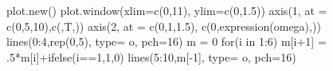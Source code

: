 \documentclass[
  letterpaper,
  DIV=11,
  numbers=noendperiod]{scrartcl}
\newenvironment{Shaded}{\begin{snugshade}}{\end{snugshade}}
\newcommand{\AttributeTok}[1]{\textcolor[rgb]{0.40,0.45,0.13}{#1}}
\newcommand{\ControlFlowTok}[1]{\textcolor[rgb]{0.00,0.23,0.31}{#1}}
\newcommand{\DecValTok}[1]{\textcolor[rgb]{0.68,0.00,0.00}{#1}}
\newcommand{\FloatTok}[1]{\textcolor[rgb]{0.68,0.00,0.00}{#1}}
\newcommand{\FunctionTok}[1]{\textcolor[rgb]{0.28,0.35,0.67}{#1}}
\newcommand{\NormalTok}[1]{\textcolor[rgb]{0.00,0.23,0.31}{#1}}
\newcommand{\OtherTok}[1]{\textcolor[rgb]{0.00,0.23,0.31}{#1}}
\newcommand{\SpecialCharTok}[1]{\textcolor[rgb]{0.37,0.37,0.37}{#1}}
\newcommand{\StringTok}[1]{\textcolor[rgb]{0.13,0.47,0.30}{#1}}
\theoremstyle{plain}
\theoremstyle{plain}
\theoremstyle{definition}
\theoremstyle{definition}
\theoremstyle{remark}
\begin{document}
\begin{Shaded}
\begin{Highlighting}[]
\FunctionTok{plot.new}\NormalTok{()}
\FunctionTok{plot.window}\NormalTok{(}\AttributeTok{xlim=}\FunctionTok{c}\NormalTok{(}\DecValTok{0}\NormalTok{,}\DecValTok{11}\NormalTok{), }\AttributeTok{ylim=}\FunctionTok{c}\NormalTok{(}\DecValTok{0}\NormalTok{,}\FloatTok{1.5}\NormalTok{))}
\FunctionTok{axis}\NormalTok{(}\DecValTok{1}\NormalTok{, }\AttributeTok{at =} \FunctionTok{c}\NormalTok{(}\DecValTok{0}\NormalTok{,}\DecValTok{5}\NormalTok{,}\DecValTok{10}\NormalTok{),}\FunctionTok{c}\NormalTok{(}\StringTok{\textquotesingle{}\textquotesingle{}}\NormalTok{,}\StringTok{\textquotesingle{}T\textquotesingle{}}\NormalTok{,}\StringTok{\textquotesingle{}\textquotesingle{}}\NormalTok{))}
\FunctionTok{axis}\NormalTok{(}\DecValTok{2}\NormalTok{, }\AttributeTok{at =} \FunctionTok{c}\NormalTok{(}\DecValTok{0}\NormalTok{,}\DecValTok{1}\NormalTok{,}\FloatTok{1.5}\NormalTok{), }\FunctionTok{c}\NormalTok{(}\DecValTok{0}\NormalTok{,}\FunctionTok{expression}\NormalTok{(omega),}\StringTok{\textquotesingle{}\textquotesingle{}}\NormalTok{))}
\FunctionTok{lines}\NormalTok{(}\DecValTok{0}\SpecialCharTok{:}\DecValTok{4}\NormalTok{,}\FunctionTok{rep}\NormalTok{(}\DecValTok{0}\NormalTok{,}\DecValTok{5}\NormalTok{), }\AttributeTok{type=} \StringTok{\textquotesingle{}o\textquotesingle{}}\NormalTok{, }\AttributeTok{pch=}\DecValTok{16}\NormalTok{)}
\NormalTok{m }\OtherTok{=} \DecValTok{0}
\ControlFlowTok{for}\NormalTok{(i }\ControlFlowTok{in} \DecValTok{1}\SpecialCharTok{:}\DecValTok{6}\NormalTok{) m[i}\SpecialCharTok{+}\DecValTok{1}\NormalTok{] }\OtherTok{=}\NormalTok{ .}\DecValTok{5}\SpecialCharTok{*}\NormalTok{m[i]}\SpecialCharTok{+}\FunctionTok{ifelse}\NormalTok{(i}\SpecialCharTok{==}\DecValTok{1}\NormalTok{,}\DecValTok{1}\NormalTok{,}\DecValTok{0}\NormalTok{)}
\FunctionTok{lines}\NormalTok{(}\DecValTok{5}\SpecialCharTok{:}\DecValTok{10}\NormalTok{,m[}\SpecialCharTok{{-}}\DecValTok{1}\NormalTok{], }\AttributeTok{type=} \StringTok{\textquotesingle{}o\textquotesingle{}}\NormalTok{, }\AttributeTok{pch=}\DecValTok{16}\NormalTok{)}
\end{Highlighting}
\end{Shaded}
\end{document}

